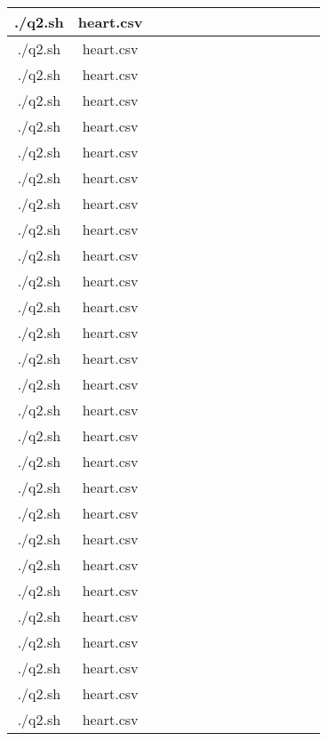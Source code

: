 \documentclass{article}
\begin{document}
\begin{table}[h!]
\begin{tabular}{|c|c|c|c|c|c|c|c|c|c|c|c|c|c|}
\hline./q2.sh & heart.csv &  &  &  &  &  &  &  &  &  &  &  &  \\ \hline./q2.sh & heart.csv &  &  &  &  &  &  &  &  &  &  &  &  \\ \hline./q2.sh & heart.csv &  &  &  &  &  &  &  &  &  &  &  &  \\ \hline./q2.sh & heart.csv &  &  &  &  &  &  &  &  &  &  &  &  \\ \hline./q2.sh & heart.csv &  &  &  &  &  &  &  &  &  &  &  &  \\ \hline./q2.sh & heart.csv &  &  &  &  &  &  &  &  &  &  &  &  \\ \hline./q2.sh & heart.csv &  &  &  &  &  &  &  &  &  &  &  &  \\ \hline./q2.sh & heart.csv &  &  &  &  &  &  &  &  &  &  &  &  \\ \hline./q2.sh & heart.csv &  &  &  &  &  &  &  &  &  &  &  &  \\ \hline./q2.sh & heart.csv &  &  &  &  &  &  &  &  &  &  &  &  \\ \hline./q2.sh & heart.csv &  &  &  &  &  &  &  &  &  &  &  &  \\ \hline./q2.sh & heart.csv &  &  &  &  &  &  &  &  &  &  &  &  \\ \hline./q2.sh & heart.csv &  &  &  &  &  &  &  &  &  &  &  &  \\ \hline./q2.sh & heart.csv &  &  &  &  &  &  &  &  &  &  &  &  \\ \hline./q2.sh & heart.csv &  &  &  &  &  &  &  &  &  &  &  &  \\ \hline./q2.sh & heart.csv &  &  &  &  &  &  &  &  &  &  &  &  \\ \hline./q2.sh & heart.csv &  &  &  &  &  &  &  &  &  &  &  &  \\ \hline./q2.sh & heart.csv &  &  &  &  &  &  &  &  &  &  &  &  \\ \hline./q2.sh & heart.csv &  &  &  &  &  &  &  &  &  &  &  &  \\ \hline./q2.sh & heart.csv &  &  &  &  &  &  &  &  &  &  &  &  \\ \hline./q2.sh & heart.csv &  &  &  &  &  &  &  &  &  &  &  &  \\ \hline./q2.sh & heart.csv &  &  &  &  &  &  &  &  &  &  &  &  \\ \hline./q2.sh & heart.csv &  &  &  &  &  &  &  &  &  &  &  &  \\ \hline./q2.sh & heart.csv &  &  &  &  &  &  &  &  &  &  &  &  \\ \hline./q2.sh & heart.csv &  &  &  &  &  &  &  &  &  &  &  &  \\ \hline./q2.sh & heart.csv &  &  &  &  &  &  &  &  &  &  &  &  \\ \hline./q2.sh & heart.csv &  &  &  &  &  &  &  &  &  &  &  &  \\ \hline./q2.sh & heart.csv &  &  &  &  &  &  &  &  &  &  &  &  \\ \hline\end{tabular}
\end{table}
\end{document}
